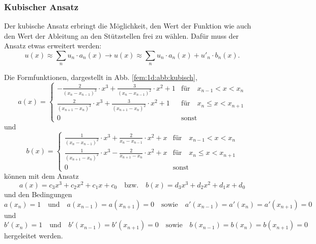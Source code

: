 \subsubsection{Kubischer Ansatz}
Der kubische Ansatz erbringt die Möglichkeit, den Wert der Funktion wie auch den Wert der Ableitung an den Stützstellen frei zu wählen.
Dafür muss der Ansatz etwas erweitert werden:
\begin{equation}
    u(x) \approx \sum_{n}{u_n \cdot a_n(x)} \rightarrow u(x) \approx \sum_{n}{u_n \cdot a_n(x) + u'_n \cdot b_n(x)}.
\end{equation}

Die Formfunktionen, dargestellt in Abb. \ref{fem:1d:abb:kubisch}, 
\begin{equation}
    a(x) = \left\{ \begin{array}{ll}
        - \frac{2}{(x_n - x_{n-1})^3} \cdot x^3 + \frac{3}{(x_n - x_{n-1})^2} \cdot x^2 + 1 
            & \text{für} \quad x_{n-1} < x < x_n \\
        \frac{2}{(x_{n+1} - x_n)^3} \cdot x^3 + \frac{3}{(x_{n+1} - x_n)^2} \cdot x^2 + 1 
            & \text{für} \quad x_n \leq x < x_{n+1} \\
        0
            & \text{sonst}
    \end{array} \right.
\end{equation}
und
\begin{equation}
    b(x) = \left\{ \begin{array}{ll}
        \frac{1}{(x_n - x_{n-1})^2} \cdot x^3 + \frac{2}{x_n - x_{n-1}} \cdot x^2 + x 
            & \text{für} \quad x_{n-1} < x < x_n \\
        \frac{1}{(x_{n+1} - x_n)^2} \cdot x^3 - \frac{2}{x_{n+1} - x_n} \cdot x^2 + x 
            & \text{für} \quad x_n \leq x < x_{n+1} \\
        0
            & \text{sonst}
    \end{array} \right.
\end{equation}
können mit dem Ansatz
\begin{equation}
    a(x) = c_3x^3 + c_2x^2 + c_1x + c_0 
    \quad \text{bzw.} \quad
    b(x) = d_3x^3 + d_2x^2 + d_1x + d_0
\end{equation}
und den Bedingungen 
\begin{equation}
        a(x_n) = 1 
        \quad \text{und} \quad
        a(x_{n-1}) = a(x_{n+1}) = 0 
        \quad \text{sowie} \quad
        a'(x_{n-1}) = a'(x_n) = a'(x_{n+1}) = 0
\end{equation}
und
\begin{equation}
        b'(x_n) = 1 
        \quad \text{und} \quad
        b'(x_{n-1}) = b'(x_{n+1}) = 0 
        \quad \text{sowie} \quad
        b(x_{n-1}) = b(x_n) = b(x_{n+1}) = 0
\end{equation}
hergeleitet werden.


